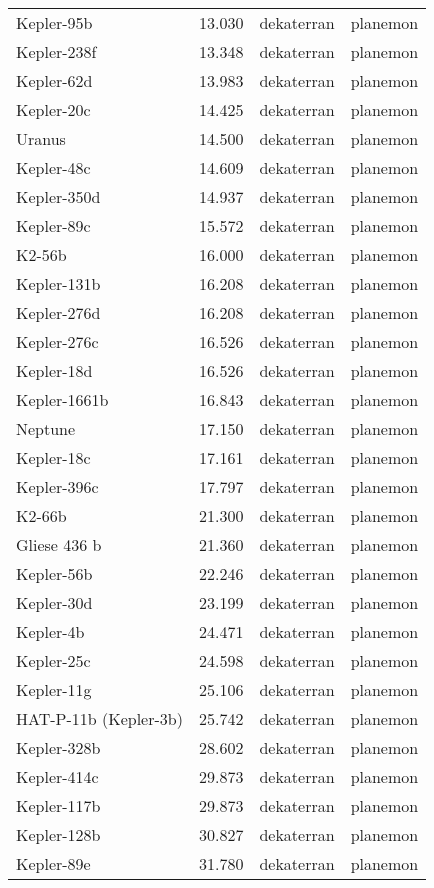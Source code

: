 \documentclass[
  letterpaper,
]{book}
\begin{document}
\begin{longtable}[]{@{}llll@{}}
Kepler-95b & 13.030 & dekaterran & planemon \\
Kepler-238f & 13.348 & dekaterran & planemon \\
Kepler-62d & 13.983 & dekaterran & planemon \\
Kepler-20c & 14.425 & dekaterran & planemon \\
Uranus & 14.500 & dekaterran & planemon \\
Kepler-48c & 14.609 & dekaterran & planemon \\
Kepler-350d & 14.937 & dekaterran & planemon \\
Kepler-89c & 15.572 & dekaterran & planemon \\
K2-56b & 16.000 & dekaterran & planemon \\
Kepler-131b & 16.208 & dekaterran & planemon \\
Kepler-276d & 16.208 & dekaterran & planemon \\
Kepler-276c & 16.526 & dekaterran & planemon \\
Kepler-18d & 16.526 & dekaterran & planemon \\
Kepler-1661b & 16.843 & dekaterran & planemon \\
Neptune & 17.150 & dekaterran & planemon \\
Kepler-18c & 17.161 & dekaterran & planemon \\
Kepler-396c & 17.797 & dekaterran & planemon \\
K2-66b & 21.300 & dekaterran & planemon \\
Gliese 436 b & 21.360 & dekaterran & planemon \\
Kepler-56b & 22.246 & dekaterran & planemon \\
Kepler-30d & 23.199 & dekaterran & planemon \\
Kepler-4b & 24.471 & dekaterran & planemon \\
Kepler-25c & 24.598 & dekaterran & planemon \\
Kepler-11g & 25.106 & dekaterran & planemon \\
HAT-P-11b (Kepler-3b) & 25.742 & dekaterran & planemon \\
Kepler-328b & 28.602 & dekaterran & planemon \\
Kepler-414c & 29.873 & dekaterran & planemon \\
Kepler-117b & 29.873 & dekaterran & planemon \\
Kepler-128b & 30.827 & dekaterran & planemon \\
Kepler-89e & 31.780 & dekaterran & planemon \\

\end{longtable}
\end{document}
